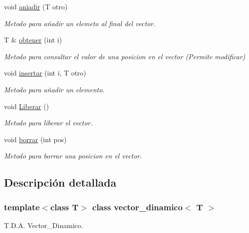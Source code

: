 \begin{DoxyCompactItemize}
void \hyperlink{classvector__dinamico_ac1d374913e6a8b7cdcc45750e29213b0}{aniadir} (T otro)
\begin{DoxyCompactList}\small\item\em Metodo para añadir un elemeto al final del vector. \end{DoxyCompactList}\item 
T \& \hyperlink{classvector__dinamico_adfa7701af640b85c9c1642e54df903e4}{obtener} (int i)
\begin{DoxyCompactList}\small\item\em Metodo para consultar el valor de una posicion en el vector (Permite modificar) \end{DoxyCompactList}\item 
void \hyperlink{classvector__dinamico_a5b60524afb2974c19d06d954064cd356}{insertar} (int i, T otro)
\begin{DoxyCompactList}\small\item\em Metodo para añadir un elemento. \end{DoxyCompactList}\item 
\mbox{\label{classvector__dinamico_a2fc10d4b34ba2ea761d3e15a2890b554}} 
void \hyperlink{classvector__dinamico_a2fc10d4b34ba2ea761d3e15a2890b554}{Liberar} ()
\begin{DoxyCompactList}\small\item\em Metodo para liberar el vector. \end{DoxyCompactList}\item 
void \hyperlink{classvector__dinamico_a3d6c024fc32563bda3508264e12f9678}{borrar} (int pos)
\begin{DoxyCompactList}\small\item\em Metodo para borrar una posicion en el vector. \end{DoxyCompactList}\end{DoxyCompactItemize}


\subsection{Descripción detallada}
\subsubsection*{template$<$class T$>$\newline
class vector\+\_\+dinamico$<$ T $>$}

T.\+D.\+A. Vector\+\_\+\+Dinamico. 

